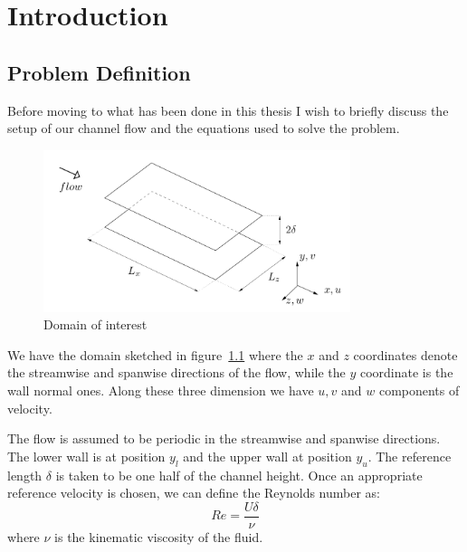 \chapter{Introduction}

\section{Problem Definition}
\pagestyle{headings}

Before moving to what has been done in this thesis I wish to briefly discuss the setup of our channel flow and the equations used to solve the problem.

\begin{figure}[h]
\centering
\includegraphics[width=0.8\textwidth]{grafici/sketch_dominio}
\caption{Domain of interest}
\label{sketch_dominio}
\end{figure}

We have the domain sketched in figure~\ref{sketch_dominio} where the $x$ and $z$ coordinates denote the streamwise and spanwise directions of the flow, while the $y$ coordinate is the wall normal ones.
Along these three dimension we have $u,v$ and $w$ components of velocity.

The flow is assumed to be periodic in the streamwise and spanwise directions. The lower wall is at position $y_l$ and the upper wall at position $y_u$. The reference length $\delta$ is taken to be one half of the channel height.
Once an appropriate reference velocity is chosen, we can define the Reynolds number as:
\[
Re = \frac{U\delta}{\nu}
\]
where $\nu$ is the kinematic viscosity of the fluid.

